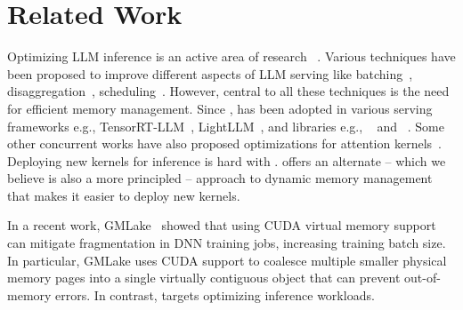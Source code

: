 \section{Related Work}
\label{sec:relatedwork}

Optimizing LLM inference is an active area of research ~\cite{helix, griggs2024melangecostefficientlarge, miao2023spotserveservinggenerativelarge, zhu2024nanoflowoptimallargelanguage, kossmann2024gpuhalfemptyhalffullpractical, strati2024dejavukvcachestreamingfast, 
lee2024infinigenefficientgenerativeinference, singhania2024lokilowrankkeysefficient, zheng2024sglangefficientexecutionstructured, ma2024compressingkvcachelongcontext,mahmud2024mapleframeworkactivepreference}. Various techniques have been proposed to improve different aspects of LLM serving like batching~\cite{orca, vllmsosp, sarathiserve2024}, disaggregation~\cite{patel2023splitwise, distserve2024, tetriinfer}, scheduling~\cite{flexgen, fastserve}. However, central to all these techniques is the need for efficient \kvcache memory management. Since \vllm, \pa has been adopted in various serving frameworks e.g., TensorRT-LLM~\cite{trtllmgithub}, LightLLM~\cite{lightllm:github}, and libraries e.g., \flashattention~\cite{fagithub} and \flashinfer~\cite{figithub}. Some other concurrent works have also proposed optimizations for attention kernels~\cite{flashattnhopper,mirage-tensor-compiler, thunderkittens, h2o2023, flashdecoding++,leanattention,flash-attention-3, pod-attn-2024}. Deploying new kernels for inference is hard with \pa.  \sysname offers an alternate -- which we believe is also a more principled -- approach to dynamic \kvcache memory management that makes it easier to deploy new kernels.

In a recent work, GMLake~\cite{gmlakeasplos24} showed that using CUDA virtual memory support can mitigate fragmentation in DNN training jobs, increasing training batch size. In particular, GMLake uses CUDA support to coalesce multiple smaller physical memory pages into a single virtually contiguous object that can prevent out-of-memory errors. In contrast, \sysname targets optimizing inference workloads. %


